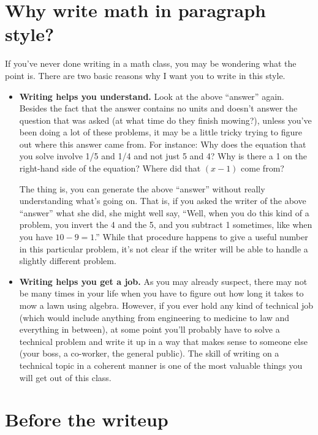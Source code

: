 \documentclass{article}
\begin{document}
\section*{Why write math in paragraph style?}
If you've never done writing in a math class, you may be wondering what the point is. There are two basic reasons why I want you to write in this style.

\begin{itemize}

\item \textbf{Writing helps you understand.} Look at the above ``answer'' again. Besides the fact that the answer contains no units and doesn't answer the question that was asked (at what time do they finish mowing?), unless you've been doing a lot of these problems, it may be a little tricky trying to figure out where this answer came from. For instance: Why does the equation that you solve involve 1/5 and 1/4 and not just 5 and 4? Why is there a 1 on the right-hand side of the equation? Where did that $(x-1)$ come from?

The thing is, you can generate the above ``answer'' without really understanding what's going on. That is, if you asked the writer of the above ``answer'' what she did, she might well say, ``Well, when you do this kind of a problem, you invert the 4 and the 5, and you subtract 1 sometimes, like when you have $10 - 9 = 1$.'' While that procedure happens to give a useful number in this particular problem, it's not clear if the writer will be able to handle a slightly different problem.

\item \textbf{Writing helps you get a job.} As you may already suspect, there may not be many times in your life when you have to figure out how long it takes to mow a lawn using algebra. However, if you ever hold any kind of technical job (which would include anything from engineering to medicine to law and everything in between), at some point you'll probably have to solve a technical problem and write it up in a way that makes sense to someone else (your boss, a co-worker, the general public). The skill of writing on a technical topic in a coherent manner is one of the most valuable things you will get out of this class.

\end{itemize}

\section*{Before the writeup}
\end{document}

